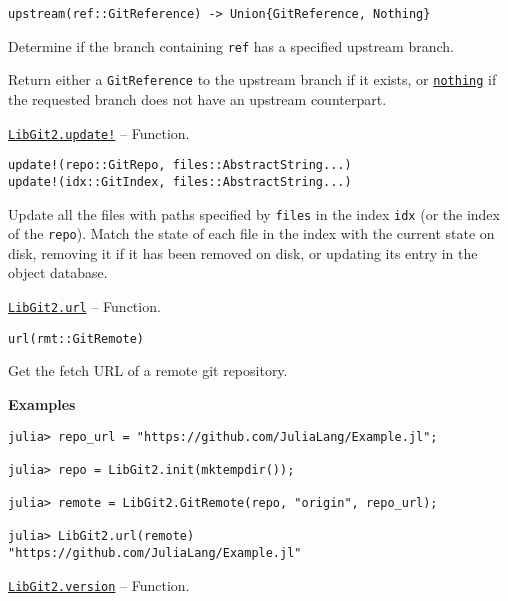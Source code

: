 \begin{adjustwidth}{2em}{0pt}


\begin{verbatim}
upstream(ref::GitReference) -> Union{GitReference, Nothing}
\end{verbatim}

Determine if the branch containing \texttt{ref} has a specified upstream branch.

Return either a \texttt{GitReference} to the upstream branch if it exists, or \hyperlink{9331422207248206047}{\texttt{nothing}} if the requested branch does not have an upstream counterpart.



\end{adjustwidth}
\hypertarget{3010892674015914384}{}
\hyperlink{3010892674015914384}{\texttt{LibGit2.update!}}  -- {Function.}

\begin{adjustwidth}{2em}{0pt}


\begin{verbatim}
update!(repo::GitRepo, files::AbstractString...)
update!(idx::GitIndex, files::AbstractString...)
\end{verbatim}

Update all the files with paths specified by \texttt{files} in the index \texttt{idx} (or the index of the \texttt{repo}). Match the state of each file in the index with the current state on disk, removing it if it has been removed on disk, or updating its entry in the object database.



\end{adjustwidth}
\hypertarget{2040666647044196560}{}
\hyperlink{2040666647044196560}{\texttt{LibGit2.url}}  -- {Function.}

\begin{adjustwidth}{2em}{0pt}


\begin{verbatim}
url(rmt::GitRemote)
\end{verbatim}

Get the fetch URL of a remote git repository.

\textbf{Examples}


\begin{verbatim}
julia> repo_url = "https://github.com/JuliaLang/Example.jl";

julia> repo = LibGit2.init(mktempdir());

julia> remote = LibGit2.GitRemote(repo, "origin", repo_url);

julia> LibGit2.url(remote)
"https://github.com/JuliaLang/Example.jl"
\end{verbatim}



\end{adjustwidth}
\hypertarget{18107764583308594889}{}
\hyperlink{18107764583308594889}{\texttt{LibGit2.version}}  -- {Function.}

